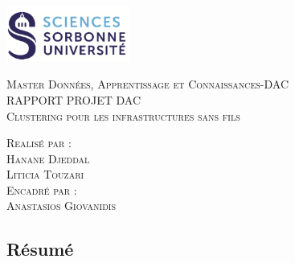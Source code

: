 \documentclass{report}
\begin{document}
\begin{titlepage}
    \begin{flushleft}
    \includegraphics[width=11em]{logo.png}\\[1.5cm]
    \end{flushleft}
    \begin{center}
        \textsc{{\LARGE \color{blue} Master Données, Apprentissage et Connaissances-DAC}}\\[5cm]
        \textsc{\huge{RAPPORT PROJET DAC}}\\[1cm]
        \textsc{\vspace{10pt}\Huge{Clustering pour les infrastructures sans fils}}\\[3cm]
        \begin{minipage}{1\textwidth}
            \begin{flushleft} \large
            \textsc{\LARGE{Realisé par :}}\\[0.5cm]
            \textsc{Hanane Djeddal}\\
            \textsc{Liticia Touzari}\\[1.5 cm]
            \textsc{\LARGE{Encadré par :}}\\[0.5cm]
            \textsc{Anastasios Giovanidis}\\
            \end{flushleft}
        \end{minipage}
        \vfill
    \end{center}
  \end{titlepage}

 
  \begin{center}
    \section*{\LARGE{Résumé}}
\end{center}
\end{document}
